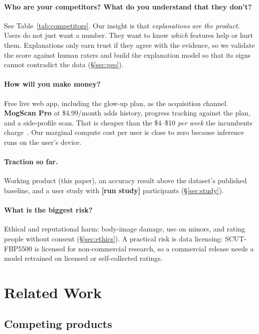 \documentclass[sigconf,nonacm]{acmart}
\newcommand{\pending}[1]{\textcolor{todo}{\textbf{[#1]}}}
\newcommand{\studyval}[1]{\ifdefined\studyPending\pending{run study}\else#1\fi}
\begin{document}
\paragraph{Who are your competitors? What do you understand that they don't?}
See Table~\ref{tab:competitors}. Our insight is that \emph{explanations are the product}. Users do not
just want a number. They want to know \emph{which} features help or hurt them. Explanations
only earn trust if they agree with the evidence, so we validate the score against human raters and build
the explanation model so that its signs cannot contradict the data (\S\ref{sec:geo}).

\paragraph{How will you make money?}
Free live web app, including the glow-up plan, as the acquisition channel. \textbf{MogScan Pro} at
\$4.99/month adds history, progress tracking against the plan, and a side-profile scan.
That is cheaper than the \$4--\$10 \emph{per week} the incumbents
charge~\cite{hyscaler2026looksmax}. Our marginal compute cost per user is close to zero because inference
runs on the user's device.

\paragraph{Traction so far.}
Working product (this paper), an accuracy result above the dataset's published baseline, and a user study
with \studyval{\studyN} participants (\S\ref{sec:study}).

\paragraph{What is the biggest risk?}
Ethical and reputational harm: body-image damage, use on minors, and rating people without consent (\S\ref{sec:ethics}).
A practical risk is data licensing: SCUT-FBP5500 is licensed for non-commercial research, so a commercial
release needs a model retrained on licensed or self-collected ratings.

\section{Related Work}

\subsection{Competing products}
\end{document}
